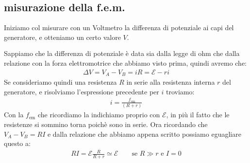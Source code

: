 \documentclass[a4paper, oneside]{article}
\newcommand{\E}{\mathcal{E}}
\begin{document}
    \subsection{misurazione della f.e.m.}
    Iniziamo col misurare con un Voltmetro la differenza di potenziale ai capi del generatore, e otteniamo un certo valore $V$.\\
    \par
    \begin{figure}
        \begin{center}
        \end{center}
    \end{figure}
    \noindent
    Sappiamo che la differenza di potenziale è data sia dalla legge di ohm che dalla relazione con la forza elettromotrice che abbiamo visto prima, quindi avremo che:
    \begin{gather*}
        \Delta V = V_A - V_B = i R = \mathcal{E} - r i
    \end{gather*}
    Se consideriamo quindi una resistenza $R$ in serie alla resistenza interna $r$ del generatore, e risolviamo l'espressione precedente per $i$ troviamo:
    \begin{gather*}
        i = \frac{f_\text{em}}{(R + r)}
    \end{gather*}
    Con la $f_\text{em}$ che ricordiamo la indichiamo proprio con $\E$, in più il fatto che le resistenze si sommino torna poichè sono in serie. Ora ricordando 
    che $V_A - V_B = R I$ e dalla relazione che abbiamo appena scritto possiamo eguagliare questo a:\\
    \begin{gather*}
        R I = \E \frac{R}{R + r} \simeq \E \qquad \text{se $R \gg r$ e $I=0$}
    \end{gather*}
\end{document}

